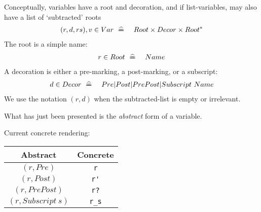 Conceptually,
variables have a root and decoration,
and if list-variables, may also have a list of `subtracted' roots
\begin{eqnarray*}
  (r,d,rs),v \in Var &\mathrel{~\widehat{=\!\!\!\!=}}~& Root \times Decor \times Root^*
\end{eqnarray*}
The root is a simple name:
\begin{eqnarray*}
  r \in Root &\mathrel{~\widehat{=\!\!\!\!=}}~& Name
\end{eqnarray*}
A decoration is either a pre-marking, a post-marking, or a subscript:
\begin{eqnarray*}
  d \in Decor &\mathrel{~\widehat{=\!\!\!\!=}}~&  Pre | Post | PrePost | Subscript~Name
\end{eqnarray*}
We use the notation $(r,d)$ when the subtracted-list is empty or irrelevant.

What has just been presented is the \emph{abstract} form of a variable.

Current concrete rendering:

\begin{tabular}{|c|c|}
  \hline
  Abstract & Concrete 
  \\ \hline
  $(r,Pre)$ & \verb"r"
  \\ \hline
  $(r,Post)$ & \verb"r'"
  \\ \hline
  $(r,PrePost)$ & \verb"r?"
  \\ \hline
  $(r,Subscript~s)$ & \verb"r_s"
  \\ \hline
\end{tabular}

